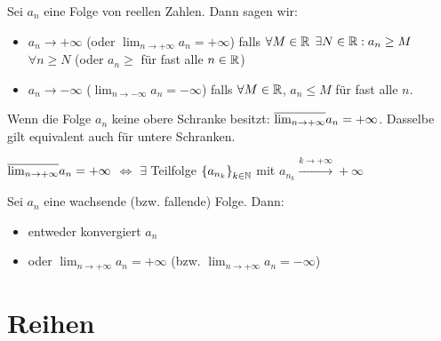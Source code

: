 \begin{Def}
  Sei $a_n$ eine Folge von reellen Zahlen. Dann sagen wir:
  \begin{itemize}
    \item $a_n\to +\infty$ (oder $\lim_{n\to +\infty} a_n=+\infty$) falls $\forall M\in\mathbb{R}$ $\exists N\in\mathbb{R}:a_n\geq M$ $\forall n\geq N$ (oder  $a_n\geq$ für fast alle $n\in\mathbb{R}$)
    \item $a_n\to-\infty$ ($\lim_{n\to -\infty} a_n=-\infty$) falls $\forall M\in\mathbb{R}$, $a_n\leq M$ für fast alle $n$.
  \end{itemize}
  Wenn die Folge $a_n$ keine obere Schranke besitzt: $\overline{\lim_{n\to+\infty}} a_n=+\infty$. Dasselbe gilt equivalent auch für untere Schranken.
\end{Def}
\begin{Ueb}
  $\overline{\lim_{n\to+\infty}}a_n=+\infty$ $\iff$ $\exists$ Teilfolge $\left\{ a_{n_k} \right\}_{k\in\mathbb{N}}$ mit $a_{n_k}\stackrel{k\to+\infty}{\to}+\infty$
\end{Ueb}
\begin{Bem}
  Sei $a_n$ eine wachsende (bzw. fallende) Folge. Dann:
  \begin{itemize}
    \item entweder konvergiert $a_n$
    \item oder $\lim_{n\to+\infty}a_n=+\infty$ (bzw. $\lim_{n\to+\infty}a_n=-\infty$)
  \end{itemize}
\end{Bem}
\section{Reihen}
